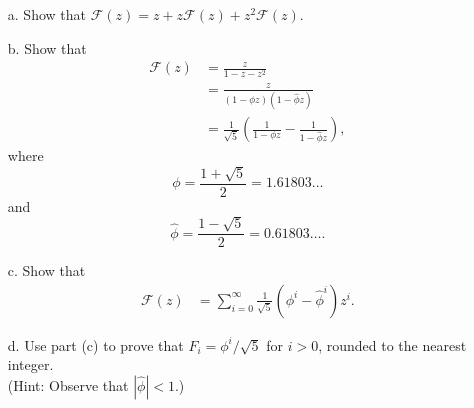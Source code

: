 \documentclass{report}
\begin{document}
\begin{enumerate}
{\begin{enumerate}
  \item[a.] Show that $\mathcal{F}(z) = z + z \mathcal{F}(z) + z^2 \mathcal{F}(z)$.
  \item[b.] Show that
    \begin{equation*}
    \begin{aligned}
      \mathcal{F}(z) &= \frac{z}{1 - z - z^2}\\
                     &= \frac{z}{(1 - \phi z)(1 - \hat\phi z)}\\
                     &= \frac{1}{\sqrt 5} \left( \frac{1}{1 - \phi z} - \frac{1}{1 - \hat\phi z} \right),
    \end{aligned}
    \end{equation*}
    where
    \[
      \phi = \frac{1 + \sqrt 5}{2} = 1.61803 \dots
    \]
    and
    \[
      \hat\phi = \frac{1 - \sqrt 5}{2} = 0.61803 \dots .
    \]
  \item[c.] Show that
    \begin{equation*}
    \begin{aligned}
      \mathcal{F}(z) &= \sum_{i = 0}^\infty \frac{1}{\sqrt 5} (\phi^i - \hat\phi^i) z^i.
    \end{aligned}
    \end{equation*}
  \item[d.] Use part (c) to prove that $F_i = \phi^i/\sqrt{5}$ for $i > 0$,
    rounded to the nearest integer.\\(Hint: Observe that $|\hat\phi| < 1$.)
\end{enumerate}
}


\end{enumerate}
\end{document}
